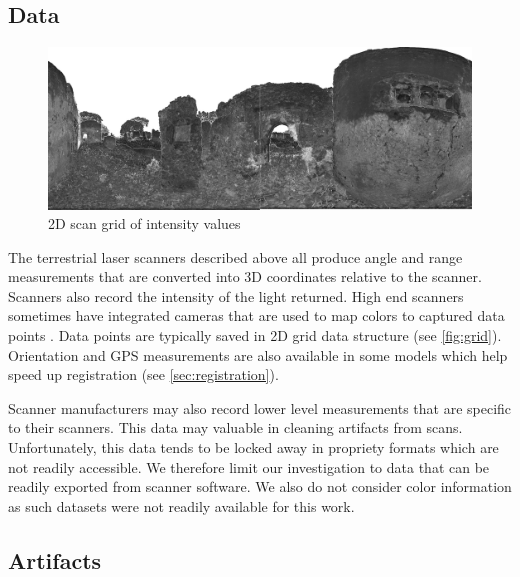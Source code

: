 \subsection{Data} \label{sec:data}


\begin{figure}[ht]
  \centering
  \includegraphics[width=1\linewidth]{images/grid}
  \caption{2D scan grid of intensity values \protect\footnotemark[\value{footnote}]}
  \label{fig:grid}
\end{figure}



The terrestrial laser scanners described above all produce angle and range measurements that are converted into 3D coordinates relative to the scanner. Scanners also record the intensity of the light returned. High end scanners sometimes have integrated cameras that are used to map colors to captured data points \cite{Frohlich2004}. Data points are typically saved in 2D grid data structure (see \autoref{fig:grid}). Orientation and GPS measurements are also available in some models which help speed up registration (see \ref{sec:registration}).

Scanner manufacturers may also record lower level measurements that are specific to their scanners. This data may valuable in cleaning artifacts from scans. Unfortunately, this data tends to be locked away in propriety formats which are not readily accessible. We therefore limit our investigation to data that can be readily exported from scanner software. We also do not consider color information as such datasets were not readily available for this work.


\subsection{Artifacts} \label{sec:artifacts}

